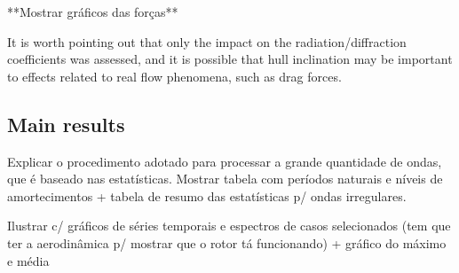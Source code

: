 **Mostrar gráficos das forças**

It is worth pointing out that only the impact on the radiation/diffraction coefficients was assessed, and it is possible that hull inclination may be important to effects related to real flow phenomena, such as drag forces.


\subsection{Main results} \label{subsec:exp_vs_num:main_results}
Explicar o procedimento adotado para processar a grande quantidade de ondas, que é baseado nas estatísticas.
Mostrar tabela com períodos naturais e níveis de amortecimentos + tabela de resumo das estatísticas p/ ondas irregulares.

Ilustrar c/ gráficos de séries temporais e espectros de casos selecionados (tem que ter a aerodinâmica p/ mostrar que o rotor tá funcionando) + gráfico do máximo e média


